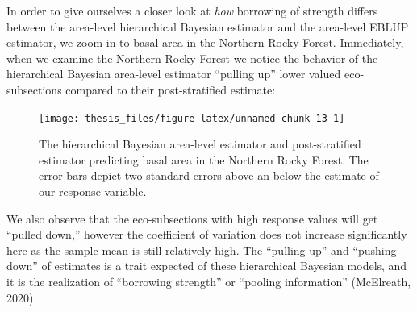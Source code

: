 \documentclass[12pt,twoside]{reedthesis}
\begin{document}
In order to give ourselves a closer look at \emph{how} borrowing of strength differs between the area-level hierarchical Bayesian estimator and the area-level EBLUP estimator, we zoom in to basal area in the Northern Rocky Forest. Immediately, when we examine the Northern Rocky Forest we notice the behavior of the hierarchical Bayesian area-level estimator ``pulling up'' lower valued eco-subsections compared to their post-stratified estimate:
\begin{figure}

{\centering \texttt{[image: thesis\_files/figure-latex/unnamed-chunk-13-1]} 

}

\caption[HB Area and Post-stratified estimates in M333]{The hierarchical Bayesian area-level estimator and post-stratified estimator predicting basal area in the Northern Rocky Forest. The error bars depict two standard errors above an below the estimate of our response variable.}\label{fig:unnamed-chunk-13}
\end{figure}
We also observe that the eco-subsections with high response values will get ``pulled down,'' however the coefficient of variation does not increase significantly here as the sample mean is still relatively high. The ``pulling up'' and ``pushing down'' of estimates is a trait expected of these hierarchical Bayesian models, and it is the realization of ``borrowing strength'' or ``pooling information'' (McElreath, 2020).
\end{document}

